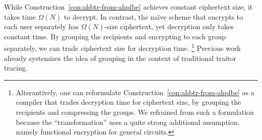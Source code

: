 While Construction~\ref{con:ahbtr-from-ahplbe} achieves constant ciphertext size,
it takes time $\Omega(N)$ to decrypt.
In contrast, the na{\"i}ve scheme that encrypts to each user separately has $\Omega(N)$-size ciphertext,
yet decryption only takes constant time.
By grouping the recipients and encrypting to each group separately,
we can trade ciphertext size for decryption time.%
\footnote{Alterantively, one can reformulate Construction~\ref{con:ahbtr-from-ahplbe} as a compiler that trades decryption time for ciphertext size, by grouping the recipients and compressing the groups.
We refrained from such a formulation because the ``transformation'' uses a quite strong additional assumption, namely functional encryption for general circuits.}
Previous work~\cite{C:Zhandry20} already systemizes the idea of grouping in the context of traditional traitor tracing.
